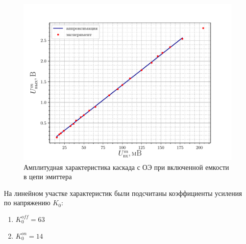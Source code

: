 \begin{figure}[H]
 	\centering
 	\includegraphics[width=\linewidth]{fig/3_C_on.pdf}
 	\caption{Амплитудная характеристика каскада с ОЭ при включенной емкости в цепи эмиттера}
 	\label{fig:Con1}
 \end{figure} 

На линейном участке характеристик были подсчитаны коэффициенты усиления по напряжению $K_0$:
\begin{enumerate}
	\item $K_0^{off}= 63$
	\item $K_0^{on}= 14 $
\end{enumerate}

